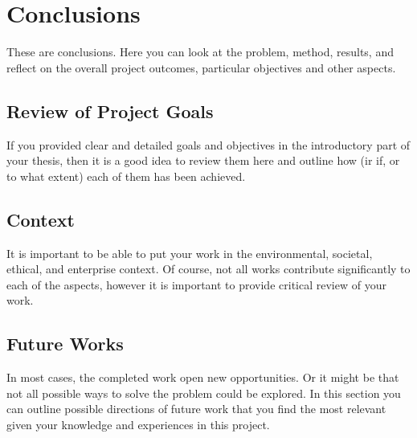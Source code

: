 \chapter{Conclusions}
\label{ch:conclusions}

These are conclusions. Here you can look at the problem, method, results, and reflect on the overall project outcomes, particular objectives and other aspects.

\section{Review of Project Goals}

If you provided clear and detailed goals and objectives in the introductory part of your thesis, then it is a good idea to review them here and outline how (ir if, or to what extent) each of them has been achieved.

\section{Context}

It is important to be able to put your work in the environmental, societal, ethical, and enterprise context. Of course, not all works contribute significantly to each of the aspects, however it is important to provide critical review of your work.

\section{Future Works}

In most cases, the completed work open new opportunities. Or it might be that not all possible ways to solve the problem could be explored. In this section you can outline possible directions of future work that you find the most relevant given your knowledge and experiences in this project.